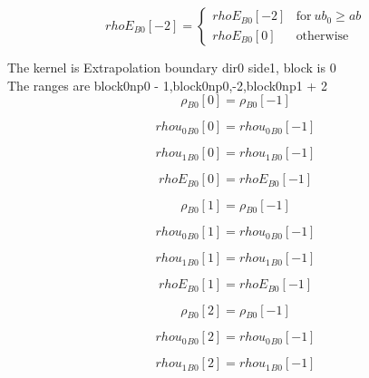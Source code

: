 \documentclass{article}
\begin{document}
\begin{dmath}{rhoE{_{B0}}}[{-2}] = \begin{cases} {rhoE{_{B0}}}[{-2}] & \text{for}\: ub_{0} \geq ab \\{rhoE{_{B0}}}[{0}] & \text{otherwise} \end{cases}\end{dmath}

\noindent The kernel is Extrapolation boundary dir0 side1, block is 0\\\noindent The ranges are block0np0 - 1,block0np0,-2,block0np1 + 2\\\begin{dmath}{\rho{_{B0}}}[{0}] = {\rho{_{B0}}}[{-1}]\end{dmath}

\begin{dmath}{rhou_{0}{_{B0}}}[{0}] = {rhou_{0}{_{B0}}}[{-1}]\end{dmath}

\begin{dmath}{rhou_{1}{_{B0}}}[{0}] = {rhou_{1}{_{B0}}}[{-1}]\end{dmath}

\begin{dmath}{rhoE{_{B0}}}[{0}] = {rhoE{_{B0}}}[{-1}]\end{dmath}

\begin{dmath}{\rho{_{B0}}}[{1}] = {\rho{_{B0}}}[{-1}]\end{dmath}

\begin{dmath}{rhou_{0}{_{B0}}}[{1}] = {rhou_{0}{_{B0}}}[{-1}]\end{dmath}

\begin{dmath}{rhou_{1}{_{B0}}}[{1}] = {rhou_{1}{_{B0}}}[{-1}]\end{dmath}

\begin{dmath}{rhoE{_{B0}}}[{1}] = {rhoE{_{B0}}}[{-1}]\end{dmath}

\begin{dmath}{\rho{_{B0}}}[{2}] = {\rho{_{B0}}}[{-1}]\end{dmath}

\begin{dmath}{rhou_{0}{_{B0}}}[{2}] = {rhou_{0}{_{B0}}}[{-1}]\end{dmath}

\begin{dmath}{rhou_{1}{_{B0}}}[{2}] = {rhou_{1}{_{B0}}}[{-1}]\end{dmath}
\end{document}
